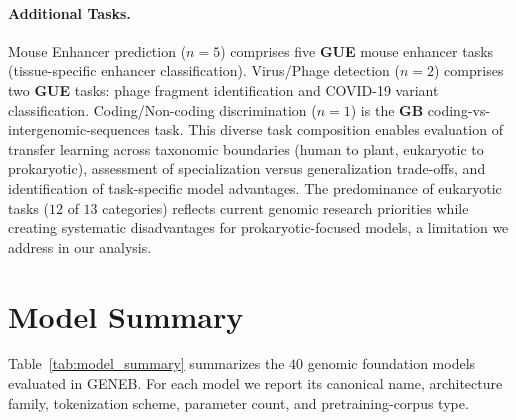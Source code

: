 \documentclass{llmxive}
\begin{document}
\paragraph{Additional Tasks.} Mouse Enhancer prediction ($n=5$)
comprises five \textbf{GUE} mouse enhancer tasks (tissue-specific
enhancer classification). Virus/Phage detection ($n=2$) comprises
two \textbf{GUE} tasks: phage fragment identification and COVID-19 variant classification. Coding/Non-coding discrimination ($n=1$)
is the \textbf{GB} coding-vs-intergenomic-sequences task.
This diverse task composition enables evaluation of transfer
learning across taxonomic boundaries (human to plant, eukaryotic
to prokaryotic), assessment of specialization versus
generalization trade-offs, and identification of task-specific
model advantages. The predominance of eukaryotic tasks ($12$ of
$13$ categories) reflects current genomic research priorities
while creating systematic disadvantages for prokaryotic-focused
models, a limitation we address in our analysis.



\section{Model Summary}
\label{app:model_summary}

Table~\ref{tab:model_summary} summarizes the $40$ genomic foundation
models evaluated in GENEB. For each model we report its canonical
name, architecture family, tokenization scheme, parameter count, and
pretraining-corpus type.
\end{document}
